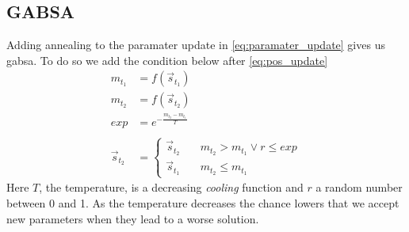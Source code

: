 \subsection{GABSA}
Adding annealing to the paramater update in \cref{eq:paramater_update} gives us \ac{gabsa}. To do so we add the condition below after \cref{eq:pos_update}
%
\begin{subequations}[resume]
\begin{align}
	m_{t_1} &= f(\vec{s}_{t_1}) \\
	m_{t_2} &= f(\vec{s}_{t_2}) \\
	exp &= e^{-\frac{m_{t_2}-m_{t_1}}{T}} \\
	\\
	\vec{s}_{t_2} &= \left\{
		\begin{array}{ll}
			\vec{s}_{t_2} & \quad m_{t_2} > m_{t_1} \lor r \leq exp\\ 
			\vec{s}_{t_1} & \quad m_{t_2} \leq m_{t_1}
		\end{array}
	\right.
\end{align}
\end{subequations}
%
Here $T$, the temperature, is a decreasing \textit{cooling} function and $r$ a random number between 0 and 1. As the temperature decreases the chance lowers that we accept new parameters when they lead to a worse solution.
